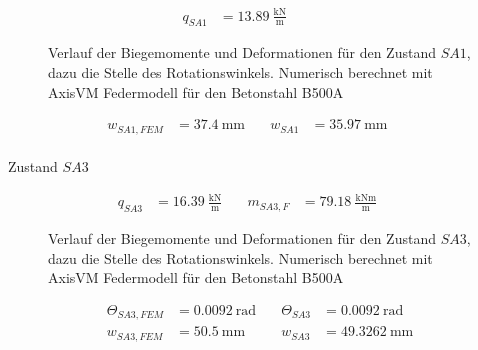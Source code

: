 \documentclass[
  11pt,
  letterpaper,
]{scrreprt}
\makeatletter
\let\oldparagraph\paragraph
\renewcommand{\paragraph}{
    \@ifstar
      \xxxParagraphStar
      \xxxParagraphNoStar
  }
\newcommand{\xxxParagraphStar}[1]{\oldparagraph*{#1}\mbox{}}
\newcommand{\xxxParagraphNoStar}[1]{\oldparagraph{#1}\mbox{}}
\makeatother
\begin{document}
\[
\begin{aligned}
q_{SA1}& = 13.89 \ \frac{\mathrm{kN}}{\mathrm{m}} \quad &  \quad &  
 \end{aligned}
\]

\begin{figure}[H]


\caption{\label{fig-jag_fem_sa1}Verlauf der Biegemomente und
Deformationen für den Zustand \(SA1\), dazu die Stelle des
Rotationswinkels. Numerisch berechnet mit AxisVM Federmodell für den
Betonstahl B500A}

\end{figure}%

\[
\begin{aligned}
w_{SA1 , FEM}& = 37.4 \ \mathrm{mm} \quad & w_{SA1}& = 35.97 \ \mathrm{mm} \quad &  
 \end{aligned}
\]

\paragraph{\texorpdfstring{Zustand
\(SA3\)}{Zustand SA3}}\label{zustand-sa3}

\[
\begin{aligned}
q_{SA3}& = 16.39 \ \frac{\mathrm{kN}}{\mathrm{m}} \quad & m_{SA3 , F}& = 79.18 \ \frac{\mathrm{kNm}}{\mathrm{m}} \quad &  
 \end{aligned}
\]

\begin{figure}[H]


\caption{\label{fig-jag_feder_my_SA3}Verlauf der Biegemomente und
Deformationen für den Zustand \(SA3\), dazu die Stelle des
Rotationswinkels. Numerisch berechnet mit AxisVM Federmodell für den
Betonstahl B500A}

\end{figure}%

\[
\begin{aligned}
\Theta_{SA3 , FEM}& = 0.0092 \ \mathrm{rad} \quad & \Theta_{SA3}& = 0.0092 \ \mathrm{rad} \\ 
w_{SA3 , FEM}& = 50.5 \ \mathrm{mm} \quad & w_{SA3}& = 49.3262 \ \mathrm{mm} \end{aligned}
\]
\end{document}
